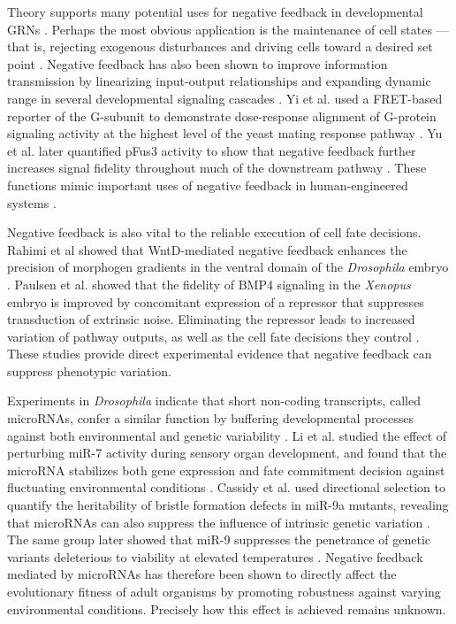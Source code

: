 Theory supports many potential uses for negative feedback in developmental GRNs \cite{Freeman2000}. Perhaps the most obvious application is the maintenance of cell states --- that is, rejecting exogenous disturbances and driving cells toward a desired set point \cite{Alon2007,Behar2007,Yi2000}. Negative feedback has also been shown to improve information transmission by linearizing input-output relationships and expanding dynamic range in several developmental signaling cascades \cite{Bhalla2002,Cheong2011,Paulsen2011,Yi2003,Yu2008a}. Yi et al. used a FRET-based reporter of the G\textalpha-subunit to demonstrate dose-response alignment of G-protein signaling activity at the highest level of the yeast mating response pathway \cite{Yi2003}. Yu et al. later quantified pFus3 activity to show that negative feedback further increases signal fidelity throughout much of the downstream pathway \cite{Yu2008a}. These functions mimic important uses of negative feedback in human-engineered systems \cite{Khammash2016}.

Negative feedback is also vital to the reliable execution of cell fate decisions. Rahimi et al showed that WntD-mediated negative feedback enhances the precision of morphogen gradients in the ventral domain of the \textit{Drosophila} embryo \cite{Rahimi2016}. Paulsen et al. showed that the fidelity of BMP4 signaling in the \textit{Xenopus} embryo is improved by concomitant expression of a repressor that suppresses transduction of extrinsic noise. Eliminating the repressor leads to increased variation of pathway outputs, as well as the cell fate decisions they control \cite{Paulsen2011}. These studies provide direct experimental evidence that negative feedback can suppress phenotypic variation. 

Experiments in \textit{Drosophila} indicate that short non-coding transcripts, called microRNAs, confer a similar function by buffering developmental processes against both environmental and genetic variability \cite{Cassidy2016a,Cassidy2013,Li2009b,Ebert2012}. Li et al. studied the effect of perturbing miR-7 activity during sensory organ development, and found that the microRNA stabilizes both gene expression and fate commitment decision against fluctuating environmental conditions \cite{Li2009b}. Cassidy et al. used directional selection to quantify the heritability of bristle formation defects in miR-9a mutants, revealing that microRNAs can also suppress the influence of intrinsic genetic variation \cite{Cassidy2013}. The same group later showed that miR-9 suppresses the penetrance of genetic variants deleterious to viability at elevated temperatures \cite{Cassidy2016a}. Negative feedback mediated by microRNAs has therefore been shown to directly affect the evolutionary fitness of adult organisms by promoting robustness against varying environmental conditions. Precisely how this effect is achieved remains unknown.

